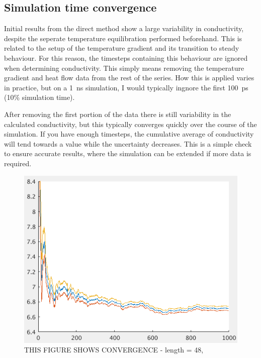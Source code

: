 \subsection{\label{sec:3.DM.time}Simulation time convergence}

Initial results from the direct method show a large variability in conductivity, despite the seperate temperature equilibration performed beforehand. This is related to the setup of the temperature gradient and its transition to steady behaviour. For this reason, the timesteps containing this behaviour are ignored when determining conductivity. This simply means removing the temperature gradient and heat flow data from the rest of the series. How this is applied varies in practice, but on a 1~ns simulation, I would typically ingnore the first 100~ps (10\% simulation time).

After removing the first portion of the data there is still variability in the calculated conductivity, but this typically converges quickly over the course of the simulation. If you have enough timesteps, the cumulative average of conductivity will tend towards a value while the uncertainty decreases. This is a simple check to ensure accurate results, where the simulation can be extended if more data is required.

\begin{figure}[h!]
\includegraphics[width=\linewidth]{Figures/direct_raw_conv_4000_2x2.png}
\caption[direct conv]{THIS FIGURE SHOWS CONVERGENCE - length = 48, }
\label{fig:direct_conv}
\end{figure}

